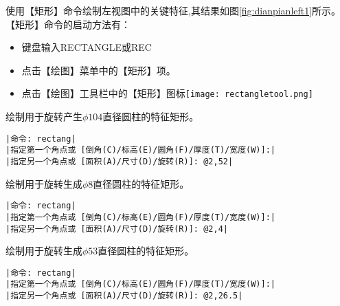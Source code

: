 \begin{procedure}
使用【矩形】命令绘制左视图中的关键特征,其结果如图\ref{fig:dianpianleft1}所示。【矩形】命令的启动方法有：
\begin{itemize}
\item 键盘输入RECTANGLE或REC
\item 点击【绘图】菜单中的【矩形】项。
\item 点击【绘图】工具栏中的【矩形】图标\texttt{[image: rectangletool.png]}
\end{itemize}
绘制用于旋转产生$\phi 104$直径圆柱的特征矩形。
\begin{lstlisting}
|命令: rectang|
|指定第一个角点或 [倒角(C)/标高(E)/圆角(F)/厚度(T)/宽度(W)]:|
|指定另一个角点或 [面积(A)/尺寸(D)/旋转(R)]: @2,52|
\end{lstlisting}
绘制用于旋转生成$\phi 8$直径圆柱的特征矩形。
\begin{lstlisting}
|命令: rectang|
|指定第一个角点或 [倒角(C)/标高(E)/圆角(F)/厚度(T)/宽度(W)]:|
|指定另一个角点或 [面积(A)/尺寸(D)/旋转(R)]: @2,4|
\end{lstlisting}
绘制用于旋转生成$\phi 53$直径圆柱的特征矩形。
\begin{lstlisting}
|命令: rectang|
|指定第一个角点或 [倒角(C)/标高(E)/圆角(F)/厚度(T)/宽度(W)]:|
|指定另一个角点或 [面积(A)/尺寸(D)/旋转(R)]: @2,26.5|
\end{lstlisting}
\end{procedure}

\endinput